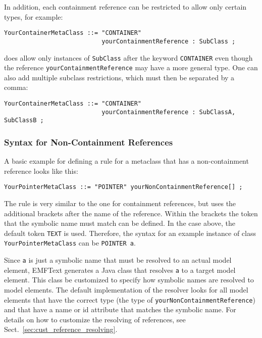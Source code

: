 In addition, each containment reference can be restricted to allow only certain 
types, for example:

\begin{lstlisting}
YourContainerMetaClass ::= "CONTAINER" 
                           yourContainmentReference : SubClass ;
\end{lstlisting}

does allow only instances of \texttt{SubClass} after the keyword
\texttt{CONTAINER} even though the reference \texttt{yourContainmentReference}
may have a more general type. One can also add multiple subclass restrictions,
which must then be separated by a comma:

\begin{lstlisting}
YourContainerMetaClass ::= "CONTAINER" 
                           yourContainmentReference : SubClassA, SubClassB ;
\end{lstlisting}

\subsubsection{Syntax for Non-Containment References}

A basic example for defining a rule for a metaclass that has a non-containment 
reference looks like this:

\begin{lstlisting}
YourPointerMetaClass ::= "POINTER" yourNonContainmentReference[] ;
\end{lstlisting}

The rule is very similar to the one for containment references, but uses the 
additional brackets after the name of the reference. Within the brackets 
the token that the symbolic name must match can be defined. In the case above,
the default token \texttt{TEXT} is used. Therefore, the syntax for an example
instance of class \texttt{YourPointerMetaClass} can be \texttt{POINTER a}.

Since \texttt{a} is just a symbolic name that must be resolved to an actual 
model element, EMFText generates a Java class that resolves \texttt{a} to a 
target model element. This class be customized to specify how symbolic names are
resolved to model elements. The default implementation of the resolver looks 
for all model elements that have the correct type (the type of
\texttt{yourNonContainmentReference}) and that have a
name or id attribute that matches the symbolic name. For details on how to
customize the resolving of references, see
Sect.~\ref{sec:cust_reference_resolving}.

